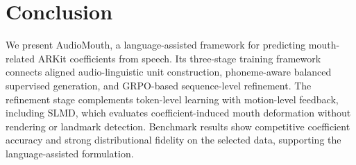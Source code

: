 \section{Conclusion}
\label{sec:conclusion}

We present AudioMouth, a language-assisted framework for predicting mouth-related ARKit coefficients from speech.
Its three-stage training framework connects aligned audio-linguistic unit construction, phoneme-aware balanced supervised generation, and GRPO-based sequence-level refinement.
The refinement stage complements token-level learning with motion-level feedback, including SLMD, which evaluates coefficient-induced mouth deformation without rendering or landmark detection.
Benchmark results show competitive coefficient accuracy and strong distributional fidelity on the selected data, supporting the language-assisted formulation.
